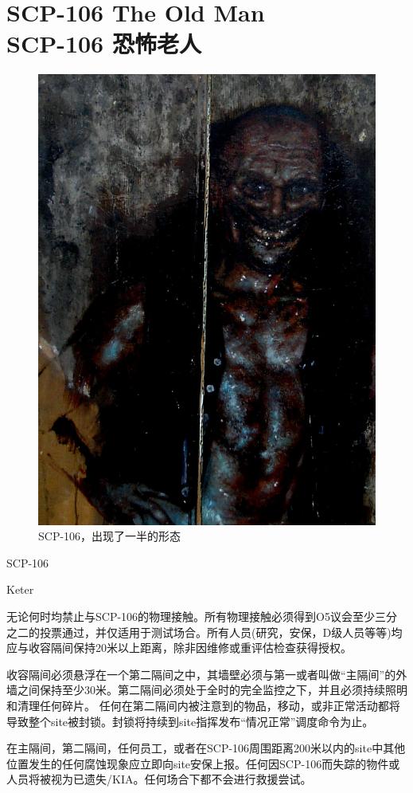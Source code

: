 \chapter[SCP-106 恐怖老人]{
    SCP-106 The Old Man\\
    SCP-106 恐怖老人
}

\label{chap:SCP-106}

\begin{figure}[H]
    \centering
    \includegraphics[width=0.5\linewidth]{images/SCP-106.jpg}
    \caption*{SCP-106，出现了一半的形态}
\end{figure}

SCP-106

Keter




无论何时均禁止与SCP-106的物理接触。所有物理接触必须得到O5议会至少三分之二的投票通过，并仅适用于测试场合。所有人员(研究，安保，D级人员等等)均应与收容隔间保持20米以上距离，除非因维修或重评估检查获得授权。

收容隔间必须悬浮在一个第二隔间之中，其墙壁必须与第一或者叫做“主隔间”的外墙之间保持至少30米。第二隔间必须处于全时的完全监控之下，并且必须持续照明和清理任何碎片。 任何在第二隔间内被注意到的物品，移动，或非正常活动都将导致整个site被封锁。封锁将持续到site指挥发布“情况正常”调度命令为止。

在主隔间，第二隔间，任何员工，或者在SCP-106周围距离200米以内的site中其他位置发生的任何腐蚀现象应立即向site安保上报。任何因SCP-106而失踪的物件或人员将被视为已遗失\slash KIA。任何场合下都不会进行救援尝试。

